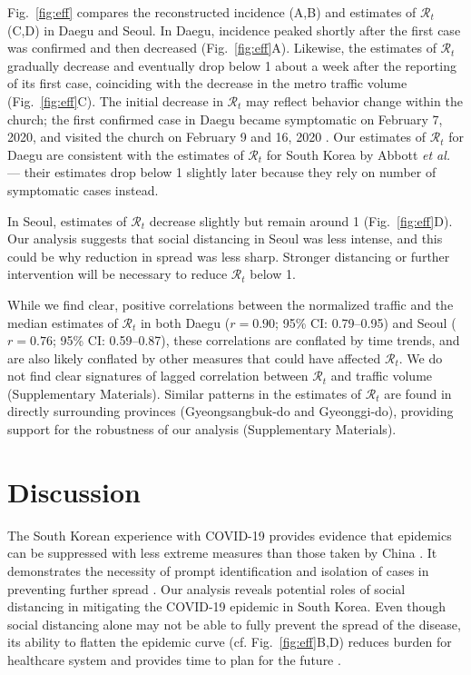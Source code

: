 \documentclass[12pt]{article}
\newcommand{\fref}[1]{Fig.~\ref{fig:#1}}
\begin{document}
\fref{eff} compares the reconstructed incidence (A,B) and estimates of $\mathcal R_t$ (C,D) in Daegu and Seoul.
In Daegu, incidence peaked shortly after the first case was confirmed and then decreased (\fref{eff}A).
Likewise, the estimates of $\mathcal R_t$ gradually decrease and eventually drop below 1 about a week after the reporting of its first case, coinciding with the decrease in the metro traffic volume (\fref{eff}C).
The initial decrease in $\mathcal R_t$ may reflect behavior change within the church; the first confirmed case in Daegu became symptomatic on February 7, 2020, and visited the church on February 9 and 16, 2020 \citep{kcdc}.
Our estimates of $\mathcal R_t$ for Daegu are consistent with the estimates of $\mathcal R_t$ for South Korea by Abbott \textit{et al.} \cite{tempvar} --- their estimates drop below 1 slightly later because they rely on number of symptomatic cases instead.

In Seoul, estimates of $\mathcal R_t$ decrease slightly but remain around 1 (\fref{eff}D).
Our analysis suggests that social distancing in Seoul was less intense, and this could be why reduction in spread was less sharp.
Stronger distancing or further intervention will be necessary to reduce $\mathcal R_t$ below 1.

While we find clear, positive correlations between the normalized traffic and the median estimates of $\mathcal R_t$ in both Daegu ($r=0.90$; 95\% CI: 0.79--0.95) and Seoul ($r=0.76$; 95\% CI: 0.59--0.87), these correlations are conflated by time trends, and are also likely conflated by other measures that could have affected $\mathcal R_t$.
We do not find clear signatures of lagged correlation between $\mathcal R_t$ and traffic volume (Supplementary Materials).
Similar patterns in the estimates of $\mathcal R_t$ are found in directly surrounding provinces (Gyeongsangbuk-do and Gyeonggi-do), providing support for the robustness of our analysis (Supplementary Materials).

\section{Discussion}

The South Korean experience with COVID-19 provides evidence that epidemics can be suppressed with less extreme measures than those taken by China \citep{kickbusch2020response}.
It demonstrates the necessity of prompt identification and isolation of cases in preventing further spread \citep{fergusonimpact, tracingkorea, science}.
Our analysis reveals potential roles of social distancing in mitigating the COVID-19 epidemic in South Korea.
Even though social distancing alone may not be able to fully prevent the spread of the disease, its ability to flatten the epidemic curve (cf. \fref{eff}B,D) reduces burden for healthcare system and provides time to plan for the future \citep{anderson2020will}.
\end{document}
